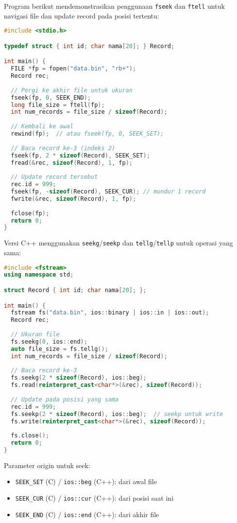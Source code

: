 \documentclass[../main.tex]{subfiles}
\begin{document}
Program berikut mendemonstrasikan penggunaan \texttt{fseek} dan \texttt{ftell} untuk navigasi file dan update record pada posisi tertentu:

\begin{lstlisting}[language=C, caption={fseek/ftell untuk akses acak}]
#include <stdio.h>

typedef struct { int id; char nama[20]; } Record;

int main() {
  FILE *fp = fopen("data.bin", "rb+");
  Record rec;
  
  // Pergi ke akhir file untuk ukuran
  fseek(fp, 0, SEEK_END);
  long file_size = ftell(fp);
  int num_records = file_size / sizeof(Record);
  
  // Kembali ke awal
  rewind(fp);  // atau fseek(fp, 0, SEEK_SET);
  
  // Baca record ke-3 (indeks 2)
  fseek(fp, 2 * sizeof(Record), SEEK_SET);
  fread(&rec, sizeof(Record), 1, fp);
  
  // Update record tersebut
  rec.id = 999;
  fseek(fp, -sizeof(Record), SEEK_CUR); // mundur 1 record
  fwrite(&rec, sizeof(Record), 1, fp);
  
  fclose(fp);
  return 0;
}
\end{lstlisting}

Versi C++ menggunakan \texttt{seekg}/\texttt{seekp} dan \texttt{tellg}/\texttt{tellp} untuk operasi yang sama:

\begin{lstlisting}[language=C++, caption={seekg/tellg untuk akses acak}]
#include <fstream>
using namespace std;

struct Record { int id; char nama[20]; };

int main() {
  fstream fs("data.bin", ios::binary | ios::in | ios::out);
  Record rec;
  
  // Ukuran file
  fs.seekg(0, ios::end);
  auto file_size = fs.tellg();
  int num_records = file_size / sizeof(Record);
  
  // Baca record ke-3
  fs.seekg(2 * sizeof(Record), ios::beg);
  fs.read(reinterpret_cast<char*>(&rec), sizeof(Record));
  
  // Update pada posisi yang sama
  rec.id = 999;
  fs.seekp(2 * sizeof(Record), ios::beg);  // seekp untuk write
  fs.write(reinterpret_cast<char*>(&rec), sizeof(Record));
  
  fs.close();
  return 0;
}
\end{lstlisting}

Parameter origin untuk seek:
\begin{itemize}
  \item \texttt{SEEK\_SET} (C) / \texttt{ios::beg} (C++): dari awal file
  \item \texttt{SEEK\_CUR} (C) / \texttt{ios::cur} (C++): dari posisi saat ini
  \item \texttt{SEEK\_END} (C) / \texttt{ios::end} (C++): dari akhir file
\end{itemize}
\end{document}
